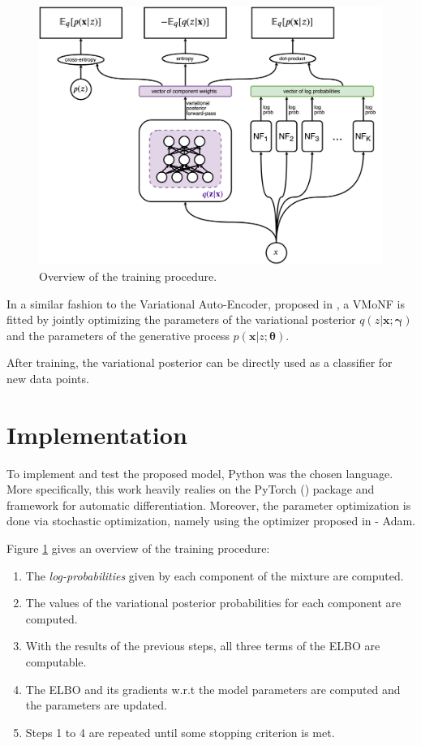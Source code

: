 \begin{figure}[!htb]
  \centering
  \includegraphics[width=0.85\linewidth]{figures/train_overview.png}
  \caption{Overview of the training procedure.}
  \label{fig:modeloverview}
\end{figure}

In a similar fashion to the Variational Auto-Encoder, proposed in \autocite{vaepaper},
a VMoNF is fitted by jointly optimizing the parameters of the variational
posterior $q(z|\bm{x}; \bm\gamma)$ and the parameters of the generative process
$p(\bm{x}|z; \bm\theta)$.

After training, the variational posterior can be directly used as a classifier
for new data points.

\section{Implementation}

To implement and test the proposed model, Python was the chosen language. More
specifically, this work heavily realies on the PyTorch (\autocite{pytorch}) package
and framework for automatic differentiation. Moreover, the parameter optimization
is done via stochastic optimization, namely using the optimizer proposed in
\autocite{adam} - Adam.

Figure \ref{fig:modeloverview} gives an overview of the training procedure:
\begin{enumerate}
    \item The \emph{log-probabilities} given by each component of the mixture
    are computed.
    \item The values of the variational posterior probabilities for each
    component are computed.
    \item With the results of the previous steps, all three terms of the ELBO
    are computable.
    \item The ELBO and its gradients w.r.t the model parameters are computed
    and the parameters are updated.
    \item Steps 1 to 4 are repeated until some stopping criterion is met.
\end{enumerate}

